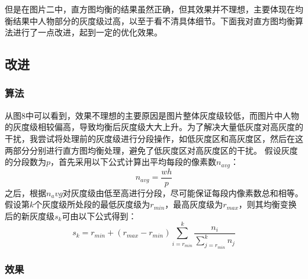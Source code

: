\documentclass[UTF8]{ctexart}
\begin{document}
			但是在图片二中，直方图均衡的结果虽然正确，但其效果并不理想，主要体现在均衡结果中人物部分的灰度级过高，以至于看不清具体细节。下面我对直方图均衡算法进行了一点改进，起到一定的优化效果。


		\subsection{改进}
			\subsubsection{算法}
			从图8中可以看到，效果不理想的主要原因是图片整体灰度级较低，而图片中人物的灰度级相较偏高，导致均衡后灰度级大大上升。为了解决大量低灰度对高灰度的干扰，我尝试将处理前的灰度级进行分段操作，如低灰度区和高灰度区，然后在这两部分分别进行直方图均衡处理，避免了低灰度区对高灰度区的干扰。\newline
			\indent 假设灰度的分段数为$p$，首先采用以下公式计算出平均每段的像素数$n_{avg}$：
			\[ n_{avg} = \frac{wh}{p} \]
			之后，根据$n_avg$对灰度级由低至高进行分段，尽可能保证每段内像素数总和相等。假设第$k$个灰度级所处段的最低灰度级为$r_{min}$，最高灰度级为$r_{max}$，则其均衡变换后的新灰度级$s_k$可由以下公式得到：
		\[ s_k=r_{min}+(r_{max}-r_{min})\sum_{i=r_{min}}^k\frac{n_i}{\sum_{j=r_{min}}^kn_j} \]


		 	\subsubsection{效果}
\end{document}
